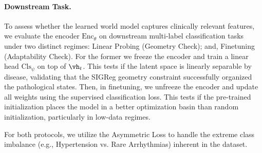 \paragraph{Downstream Task.}
To assess whether the learned world model captures clinically relevant features, we evaluate the encoder $\text{Enc}_\theta$ on downstream multi-label classification tasks under two distinct regimes: Linear Probing (Geometry Check); and, Finetuning (Adaptability Check). For the former we freeze the encoder and train a linear head $\text{Cls}_\psi$ on top of $\vh_t$. This tests if the latent space is linearly separable by disease, validating that the SIGReg geometry constraint successfully organized the pathological states. Then, in finetuning, we unfreeze the encoder and update all weights using the supervised classification loss. This tests if the pre-trained initialization places the model in a better optimization basin than random initialization, particularly in low-data regimes.

For both protocols, we utilize the Asymmetric Loss to handle the extreme class imbalance (e.g., Hypertension vs. Rare Arrhythmias) inherent in the dataset.
